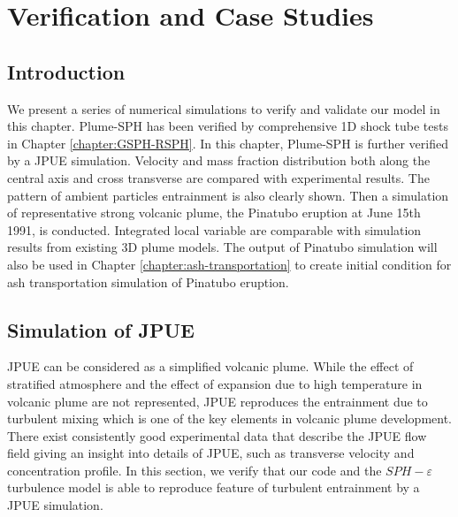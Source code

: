 \chapter{Verification and Case Studies} \label{chapter:case-studies}

\section{Introduction}
We present a series of numerical simulations to verify and validate our model in this chapter. Plume-SPH has been verified by comprehensive 1D shock tube tests in Chapter \ref{chapter:GSPH-RSPH}. In this chapter, Plume-SPH is further verified by a JPUE simulation. Velocity and mass fraction distribution both along the central axis and cross transverse are compared with experimental results. The pattern of ambient particles entrainment is also clearly shown. Then a simulation of representative strong volcanic plume, the Pinatubo eruption at June 15th 1991, is conducted. Integrated local variable are comparable with simulation results from existing 3D plume models.
The output of Pinatubo simulation will also be used in Chapter \ref{chapter:ash-transportation} to create initial condition for ash transportation simulation of Pinatubo eruption.

\section{Simulation of JPUE}
JPUE can be considered as a simplified volcanic plume. While the effect of stratified atmosphere and the effect of expansion due to high temperature in volcanic plume are not represented, JPUE reproduces the entrainment due to turbulent mixing which is one of the key elements in volcanic plume development. There exist consistently good experimental data \citep{list1982turbulent,dimotakis1983structure, papanicolaou1988investigations, ezzamel2015dynamical} that describe the JPUE flow field giving an insight into details of JPUE, such as transverse velocity and concentration profile. In this section, we verify that our code and the $SPH-\varepsilon$ turbulence model is able to reproduce feature of turbulent entrainment by a JPUE simulation.

